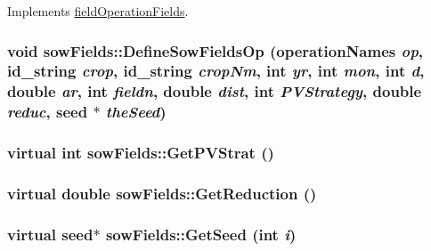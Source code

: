 Implements \hyperlink{classfield_operation_fields_ae5d8585b7e57196ce3801eed29677b3e}{fieldOperationFields}.\hypertarget{classsow_fields_ac6618566ccb801d5c07a11ea4c216750}{
\subsubsection[{DefineSowFieldsOp}]{\setlength{\rightskip}{0pt plus 5cm}void sowFields::DefineSowFieldsOp ({\bf operationNames} {\em op}, \/  {\bf id\_\-string} {\em crop}, \/  {\bf id\_\-string} {\em cropNm}, \/  int {\em yr}, \/  int {\em mon}, \/  int {\em d}, \/  double {\em ar}, \/  int {\em fieldn}, \/  double {\em dist}, \/  int {\em PVStrategy}, \/  double {\em reduc}, \/  {\bf seed} $\ast$ {\em theSeed})}}
\label{classsow_fields_ac6618566ccb801d5c07a11ea4c216750}
\hypertarget{classsow_fields_a251cf5b16ca5ac4128918bb47bbf4b0f}{
\subsubsection[{GetPVStrat}]{\setlength{\rightskip}{0pt plus 5cm}virtual int sowFields::GetPVStrat ()}}
\label{classsow_fields_a251cf5b16ca5ac4128918bb47bbf4b0f}
\hypertarget{classsow_fields_ae5c43a7143c4c4f543a1157c17acb33c}{
\subsubsection[{GetReduction}]{\setlength{\rightskip}{0pt plus 5cm}virtual double sowFields::GetReduction ()}}
\label{classsow_fields_ae5c43a7143c4c4f543a1157c17acb33c}
\hypertarget{classsow_fields_a958ec0bc5d51ebaa5f13c27dcb1d3620}{
\subsubsection[{GetSeed}]{\setlength{\rightskip}{0pt plus 5cm}virtual {\bf seed}$\ast$ sowFields::GetSeed (int {\em i})}}
